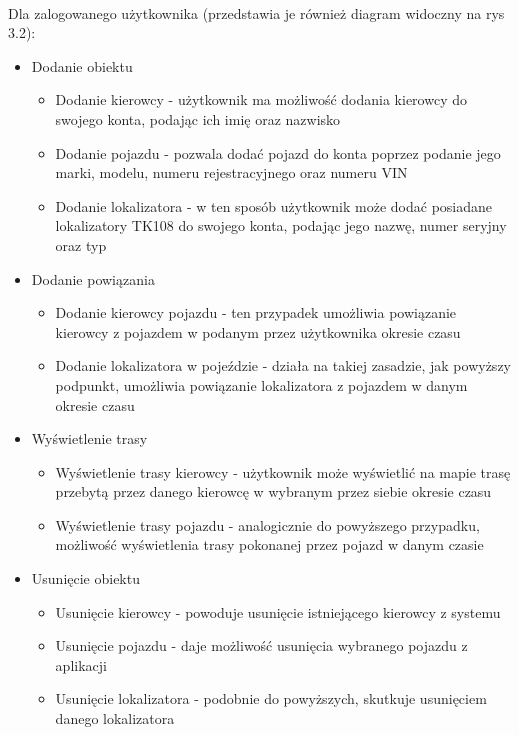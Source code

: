 \paragraph{}
Dla zalogowanego użytkownika (przedstawia je również diagram widoczny na rys 3.2):
\begin{itemize}
\item Dodanie obiektu
	\begin{itemize}
	\item Dodanie kierowcy - użytkownik ma możliwość dodania kierowcy do swojego konta, podając ich imię oraz nazwisko
	\item Dodanie pojazdu - pozwala dodać pojazd do konta poprzez podanie jego marki, modelu, numeru rejestracyjnego oraz numeru VIN
	\item Dodanie lokalizatora - w ten sposób użytkownik może dodać posiadane lokalizatory TK108 do swojego konta, podając jego nazwę, numer seryjny oraz typ
	\end{itemize}
\item Dodanie powiązania
\begin{itemize}
	\item Dodanie kierowcy pojazdu - ten przypadek umożliwia powiązanie kierowcy z pojazdem w podanym przez użytkownika okresie czasu 
	\item Dodanie lokalizatora w pojeździe - działa na takiej zasadzie, jak powyższy podpunkt, umożliwia powiązanie lokalizatora z pojazdem w danym okresie czasu
\end{itemize}
\item Wyświetlenie trasy
\begin{itemize}
	\item Wyświetlenie trasy kierowcy - użytkownik może wyświetlić na mapie trasę przebytą przez danego kierowcę w wybranym przez siebie okresie czasu
	\item Wyświetlenie trasy pojazdu - analogicznie do powyższego przypadku, możliwość wyświetlenia trasy pokonanej przez pojazd w danym czasie
\end{itemize}
\item Usunięcie obiektu
\begin{itemize}
	\item Usunięcie kierowcy - powoduje usunięcie istniejącego kierowcy z systemu
	\item Usunięcie pojazdu - daje możliwość usunięcia wybranego pojazdu z aplikacji
	\item Usunięcie lokalizatora - podobnie do powyższych, skutkuje usunięciem danego lokalizatora
\end{itemize}

\end{itemize}
